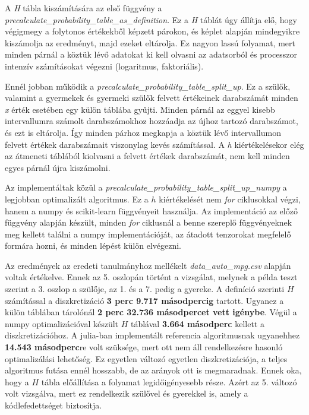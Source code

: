 A \emph{H} tábla kiszámítására az első függvény a \emph{precalculate\_probability\_table\_as\_definition}. Ez a \emph{H} táblát úgy állítja elő, hogy végigmegy a folytonos értékekből képzett párokon, és képlet alapján mindegyikre kiszámolja az eredményt, majd ezeket eltárolja. Ez nagyon lassú folyamat, mert minden párnál a köztük lévő adatokat ki kell olvasni az adatsorból és processzor intenzív számításokat végezni (logaritmus, faktoriális).

Ennél jobban működik a \emph{precalculate\_probability\_table\_split\_up}. Ez a szülők, valamint a gyermekek és gyermeki szülők felvett értékeinek darabszámát minden \emph{x} érték esetében egy külön táblába gyűjti. Minden párnál az eggyel kisebb intervallumra számolt darabszámokhoz hozzáadja az újhoz tartozó darabszámot, és ezt is eltárolja. Így minden párhoz megkapja a köztük lévő intervallumon felvett értékek darabszámait viszonylag kevés számítással. A \emph{h} kiértékelésekor elég az átmeneti táblából kiolvasni a felvett értékek darabszámát, nem kell minden egyes párnál újra kiszámolni.

Az implementáltak közül a \emph{precalculate\_probability\_table\_split\_up\_numpy} a legjobban optimalizált algoritmus. Ez a $h$ kiértékelését nem \emph{for} ciklusokkal végzi, hanem a numpy és scikit-learn függvényeit használja. Az implementáció az előző függvény alapján készült, minden \emph{for} ciklusnál a benne szereplő függvényeknek meg kellett találni a numpy implementációját, az átadott tenzorokat megfelelő formára hozni, és minden lépést külön elvégezni.

Az eredmények az eredeti tanulmányhoz mellékelt \emph{data\_auto\_mpg.csv} alapján voltak értékelve. Ennek az 5. oszlopán történt a vizsgálat, melynek a példa teszt szerint a 3. oszlop a szülője, az 1. és a 7. pedig a gyereke. A definíció szerinti $H$ számítással a diszkretizáció \textbf{3 perc 9.717 másodpercig}  tartott. Ugyanez a külön táblában tárolónál \textbf{2 perc 32.736 másodpercet vett igénybe}. Végül a numpy optimalizációval készült $H$ táblával \textbf{3.664 másodperc} kellett a diszkretizációhoz. A julia-ban implementált referencia algoritmusnak ugyanehhez \textbf{14.543 másodperc}re volt szüksége, mert ott nem áll rendelkezésre hasonló optimalizálási lehetőség. Ez egyetlen változó egyetlen diszkretizációja, a teljes algoritmus futása ennél hosszabb, de az arányok ott is megmaradnak. Ennek oka, hogy a $H$ tábla előállítása a folyamat legidőigényesebb része. Azért az 5. változó volt vizsgálva, mert ez rendelkezik szülővel és gyerekkel is, amely a kódlefedettséget biztosítja.


